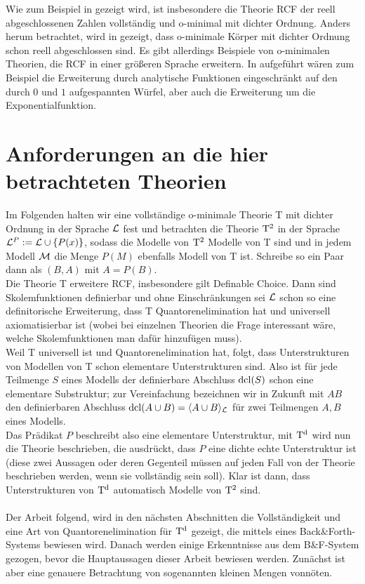 \begin{fact}
	Wie zum Beispiel in \cite{Marker} gezeigt wird, ist insbesondere die Theorie RCF der reell abgeschlossenen Zahlen vollständig und o-minimal mit dichter Ordnung.  Anders herum betrachtet, wird in \cite{Pillay} gezeigt, dass o-minimale Körper mit dichter Ordnung schon reell abgeschlossen sind. Es gibt allerdings Beispiele von o-minimalen Theorien, die RCF in einer größeren Sprache erweitern. In \cite{Wilkie} aufgeführt wären zum Beispiel die Erweiterung durch analytische Funktionen eingeschränkt auf den durch $0$ und $1$ aufgespannten Würfel, aber auch die Erweiterung um die Exponentialfunktion.
\end{fact}

\newpage
\section{Anforderungen an die hier betrachteten Theorien}

Im Folgenden halten wir eine vollständige o-minimale Theorie T mit dichter Ordnung in der Sprache $\mathcal{L}$ fest und betrachten die Theorie $\operatorname{T^2}$ in der Sprache $\mathcal{L}^P:=\mathcal{L}\cup\{P(x)\}$, sodass die Modelle von $\operatorname{T^2}$ Modelle von T sind und in jedem Modell $\mathcal{M}$ die Menge $P(M)$ ebenfalls Modell von T ist. Schreibe so ein Paar dann als $(B,A)$ mit $A=P(B)$.\\
Die Theorie T erweitere RCF, insbesondere gilt Definable Choice. Dann sind Skolemfunktionen definierbar und ohne Einschränkungen sei $\mathcal{L}$ schon so eine definitorische Erweiterung, dass T Quantorenelimination hat und universell axiomatisierbar ist (wobei bei einzelnen Theorien die Frage interessant wäre, welche Skolemfunktionen man dafür hinzufügen muss).\\
Weil T universell ist und Quantorenelimination hat, folgt, dass Unterstrukturen von Modellen von T schon elementare Unterstrukturen sind. Also ist für jede Teilmenge $S$ eines Modells der definierbare Abschluss $\operatorname{dcl}(S)$ schon eine elementare Substruktur; zur Vereinfachung bezeichnen wir in Zukunft mit $AB$ den definierbaren Abschluss $\operatorname{dcl}(A\cup B)=\langle A\cup B\rangle_{\mathcal{L}}$ für zwei Teilmengen $A,B$ eines Modells.\\
Das Prädikat $P$ beschreibt also eine elementare Unterstruktur, mit $\operatorname{T^d}$ wird nun die Theorie beschrieben, die ausdrückt, dass $P$ eine dichte echte Unterstruktur ist (diese zwei Aussagen oder deren Gegenteil müssen auf jeden Fall von der Theorie beschrieben werden, wenn sie vollständig sein soll). Klar ist dann, dass Unterstrukturen von $\operatorname{T^d}$ automatisch Modelle von $\operatorname{T^2}$ sind.\\\\
Der Arbeit \cite{VanDenDries} folgend, wird in den nächsten Abschnitten die Vollständigkeit und eine Art von Quantorenelimination für $\operatorname{T^d}$ gezeigt, die mittels eines Back\&Forth-Systems bewiesen wird. Danach werden einige Erkenntnisse aus dem B\&F-System gezogen, bevor die Hauptaussagen dieser Arbeit bewiesen werden. Zunächst ist aber eine genauere Betrachtung von sogenannten kleinen Mengen vonnöten.
\newpage

